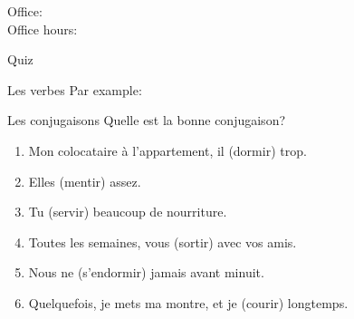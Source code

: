 \documentclass{beamer}
\subtitle[Heures et verbes \lexi{-ir}]{Les heures et les verbes \lexi{-ir}}
\begin{document}
  \begin{frame}
    \titlepage
    \tiny{Office: \\
          Office hours: }
  \end{frame}

  \begin{frame}{}
    \begin{center}
      \Large Quiz
    \end{center}
  \end{frame}

  \begin{frame}{Les verbes }
    Par example:
    \begin{center}
      
    \end{center}
  \end{frame}

  \begin{frame}{Les conjugaisons}
    Quelle est la bonne conjugaison? \\
    \begin{enumerate}
      \item Mon colocataire à l'appartement, il \underline{} (dormir) trop.
      \item Elles \underline{} (mentir) assez.
      \item Tu \underline{} (servir) beaucoup de nourriture.
      \item Toutes les semaines, vous \underline{} (sortir) avec vos amis.
      \item Nous ne \underline{} (s'endormir) jamais avant minuit.
      \item Quelquefois, je mets ma montre, et je \underline{} (courir) longtemps.
    \end{enumerate}
  \end{frame}
\end{document}
